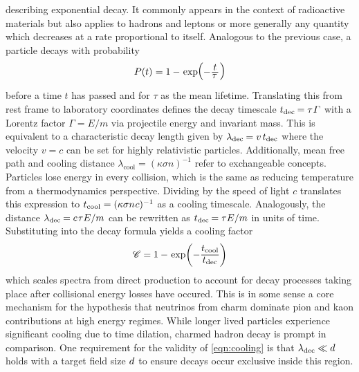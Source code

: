 describing exponential decay. It commonly appears in the context of radioactive materials but also applies to hadrons and leptons
or more generally any quantity which decreases at a rate proportional to itself. Analogous to the previous case, a particle
decays with probability
\begin{equation*}
	P(t) \kern+0.3pt = 1 - \kern+0.9pt \exp \kern-2.0pt
	\raisebox{0.25ex}{\(\Bigl( \raisebox{-0.25ex}{\(-\frac{\raisebox{-0.5ex}{$t$}}{\raisebox{1.0ex}{$\tau \kern+1.0pt$}}\)}
	\kern+0.5pt \Bigr)\)}
\end{equation*}
before a time $t$ has passed and for $\tau$ as the mean lifetime. Translating this from rest frame to laboratory coordinates defines
the decay timescale $t_\text{dec} \kern-0.6pt = \tau \kern+0.4pt \varGamma$ with a Lorentz factor $\varGamma = E / m$ via
projectile energy and invariant mass. This is equivalent to a characteristic decay length given by
$\lambda_\text{dec} \kern-0.5pt = v \kern+1.5pt t_\text{dec}$ where the velocity $v = c$ can be set for highly relativistic particles.
Additionally, mean free path and cooling distance $\lambda_\text{cool} = (\kappa\sigma n)^{-1}$ refer to exchangeable concepts. Particles
lose energy in every collision, which is the same as reducing temperature from a thermodynamics perspective. Dividing by the speed of
light $c$ translates this expression to $t_\text{cool} = (\kappa\sigma n \kern+0.5pt c)^{-1}$ as a cooling timescale. Analogously, the
distance $\lambda_\text{dec} \kern-0.5pt = c \kern+0.8pt \tau E / m$ can be rewritten as
$t_\text{dec} \kern-0.6pt = \tau E / m$ in units of time. Substituting into the decay formula yields a cooling factor
\begin{equation}
	\mathscr{C} = 1 - \kern+0.9pt \exp \biggl( -\frac{t_\text{cool}}{\raisebox{0.5ex}{$t_\text{dec}$}} \biggr)
	\label{eqn:cooling}
\end{equation}
which scales spectra from direct production to account for decay processes taking place after collisional energy losses have occured.
This is in some sense a core mechanism for the hypothesis that neutrinos from charm dominate pion and kaon contributions at high
energy regimes. While longer lived particles experience significant cooling due to time dilation, charmed hadron decay is prompt
in comparison. One requirement for the validity of \eqref{eqn:cooling} is that $\lambda_\text{dec} \kern-0.3pt \ll d \kern+0.5pt$
holds with a target field size $d \kern+0.5pt$ to ensure decays occur exclusive inside this region.




